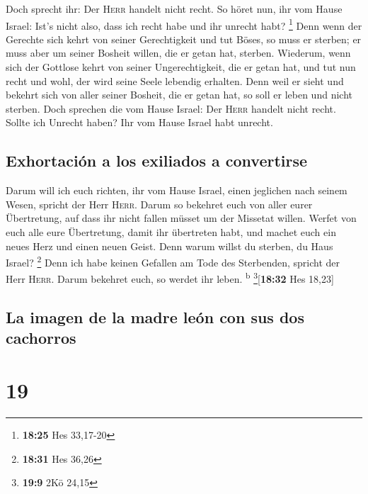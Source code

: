  Doch sprecht ihr: Der \textsc{Herr} handelt nicht recht.
So höret nun, ihr vom Hause Israel: Ist's nicht also, dass ich recht
habe und ihr unrecht habt? \footnote{\textbf{18:25} Hes 33,17-20}
 Denn wenn der Gerechte sich kehrt von seiner
Gerechtigkeit und tut Böses, so muss er sterben; er muss aber um seiner
Bosheit willen, die er getan hat, sterben.  Wiederum,
wenn sich der Gottlose kehrt von seiner Ungerechtigkeit, die er getan
hat, und tut nun recht und wohl, der wird seine Seele lebendig erhalten.
 Denn weil er sieht und bekehrt sich von aller seiner
Bosheit, die er getan hat, so soll er leben und nicht sterben.
 Doch sprechen die vom Hause Israel: Der \textsc{Herr}
handelt nicht recht. Sollte ich Unrecht haben? Ihr vom Hause Israel habt
unrecht.

\hypertarget{exhortaciuxf3n-a-los-exiliados-a-convertirse}{%
\subsection{Exhortación a los exiliados a
convertirse}\label{exhortaciuxf3n-a-los-exiliados-a-convertirse}}

 Darum will ich euch richten, ihr vom Hause Israel, einen
jeglichen nach seinem Wesen, spricht der Herr \textsc{Herr}. Darum so
bekehret euch von aller eurer Übertretung, auf dass ihr nicht fallen
müsset um der Missetat willen.  Werfet von euch alle eure
Übertretung, damit ihr übertreten habt, und machet euch ein neues Herz
und einen neuen Geist. Denn warum willst du sterben, du Haus Israel?
\footnote{\textbf{18:31} Hes 36,26}  Denn ich habe keinen
Gefallen am Tode des Sterbenden, spricht der Herr \textsc{Herr}. Darum
bekehret euch, so werdet ihr leben. \textsuperscript{b}
\footnote{\textbf{19:9} 2Kö 24,15}{[}\textbf{18:32} Hes 18,23{]}

\hypertarget{la-imagen-de-la-madre-leuxf3n-con-sus-dos-cachorros}{%
\subsection{La imagen de la madre león con sus dos
cachorros}\label{la-imagen-de-la-madre-leuxf3n-con-sus-dos-cachorros}}

\hypertarget{section-18}{%
\section{19}\label{section-18}}

